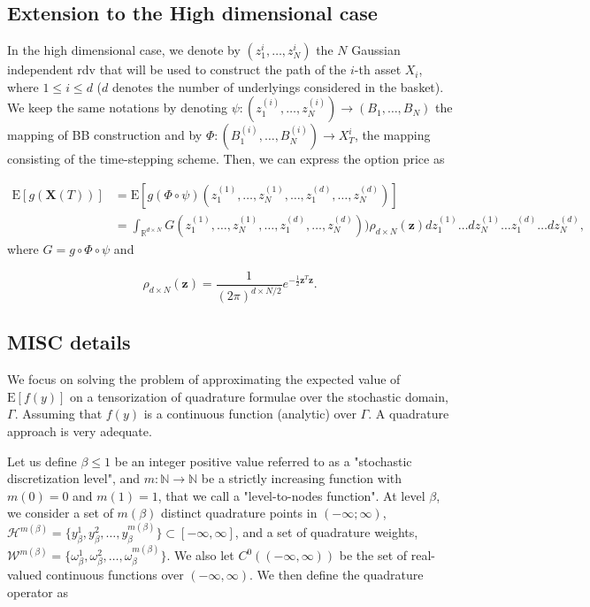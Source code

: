 \documentclass[11pt]{article}
\newcommand{\expt}[1]{\mathrm{E}\left[#1\right]}
\newcommand{\rset}{\mathbb{R}}
\newcommand{\nset}{\mathbb{N}}
\newcommand{\PERIOD}{.}
\newcommand{\COMMA}{,}
\begin{document}
\subsection{Extension to the High dimensional case}
In the high dimensional case, we denote by $(z_1^{i},\dots,z_N^{i})$ the $N$ Gaussian independent rdv that will be used to construct the path of the $i$-th asset $X_i$, where $1 \le i \le d$ ($d$ denotes the number of underlyings considered in the basket). We keep the  same notations by denoting  $\psi: (z_1^{(i)},\dots,z_N^{(i)}) \rightarrow (B_1,\dots,B_N)$ the mapping of BB construction and by $\Phi: (B^{(i)}_1,\dots,B^{(i)}_N) \rightarrow X^{i}_T$, the mapping consisting of the time-stepping scheme. Then, we can express the option price as

\begin{align}\label{eq: option price as integral_basket}
	\expt{g(\mathbf{X}(T))}&=	\expt{g\left(\Phi \circ \psi \right) (z_1^{(1)}, \dots, z_N^{(1)}, \dots, z_1^{(d)},\dots,z^{(d)}_N)} \nonumber\\
	&=\int_{\rset^{d \times N}} G(z_1^{(1)}, \dots, z_N^{(1)}, \dots, z_1^{(d)},\dots,z^{(d)}_N)) \rho_{d \times N}(\mathbf{z}) dz_1^{(1)} \dots dz_N^{(1)} \dots z_1^{(d)} \dots dz^{(d)}_N \COMMA
\end{align}
where $G=g \circ \Phi \circ \psi$ and

\begin{equation}
\rho_{d \times N}(\mathbf{z})=\frac{1}{(2 \pi)^{{d \times N}/2}} e^{-\frac{1}{2} \mathbf{z}^T \mathbf{z}} \PERIOD
\end{equation}

\subsection{MISC details} \label{sec:Details of the MISC}

We focus on solving the problem of  approximating the expected value of $\expt{f(y)}$ on a tensorization of quadrature formulae over the stochastic domain, $\Gamma$. Assuming that $f(y)$ is a continuous function (analytic) over $\Gamma$. A quadrature approach is very adequate.

Let us define $\beta \le 1$ be an integer positive value referred to as a "stochastic discretization level", and $m: \nset \rightarrow \nset$ be a strictly increasing function with $m(0)=0$ and $m(1)=1$, that we call a "level-to-nodes function". At level $\beta$, we consider a set of $m(\beta)$ distinct quadrature points in $(-\infty; \infty)$, $\mathcal{H}^{m(\beta)}=\{y^1_\beta,y^2_\beta,\dots,y_\beta^{m(\beta)}\} \subset [-\infty,\infty]$, and a set of quadrature weights, $\mathcal{W}^{m(\beta)}=\{\omega^1_\beta,\omega^2_\beta,\dots,\omega_\beta^{m(\beta)}\}$. We also let $C^0((-\infty,\infty))$ be the set of real-valued continuous functions over $(-\infty, \infty)$. We then define the quadrature operator as
\end{document}
